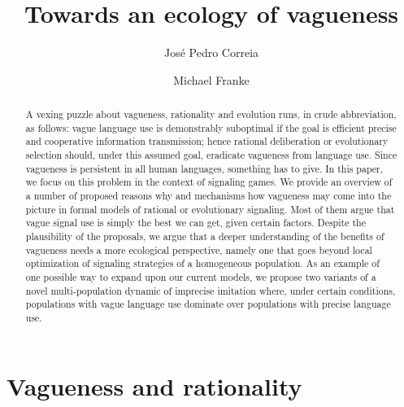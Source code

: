 \documentclass[a4paper]{article}
\begin{document}
\title{Towards an ecology of vagueness}
\author{Jos\'e Pedro Correia \and Michael Franke}
\date{}

\maketitle

\begin{abstract}
A vexing puzzle about vagueness, rationality and evolution runs, in crude abbreviation, as follows: vague language use is demonstrably suboptimal if the goal is efficient precise and cooperative information transmission; hence rational deliberation or evolutionary selection should, under this assumed goal, eradicate vagueness from language use.
Since vagueness is persistent in all human languages, something has to give.
In this paper, we focus on this problem in the context of signaling games.
We provide an overview of a number of proposed reasons why and mechanisms how vagueness may come into the picture in formal models of rational or evolutionary signaling.
Most of them argue that vague signal use is simply the best we can get, given certain factors.
Despite the plausibility of the proposals, we argue that a deeper understanding of the benefits of vagueness needs a more ecological perspective, namely one that goes beyond local optimization of signaling strategies of a homogeneous population.
As an example of one possible way to expand upon our current models, we propose two variants of
a novel multi-population dynamic of imprecise imitation where, under certain conditions,
populations with vague language use dominate over populations with precise language use.
\end{abstract}

\tableofcontents


\section{Vagueness and rationality}
\label{sec:vagueness}
\end{document}
